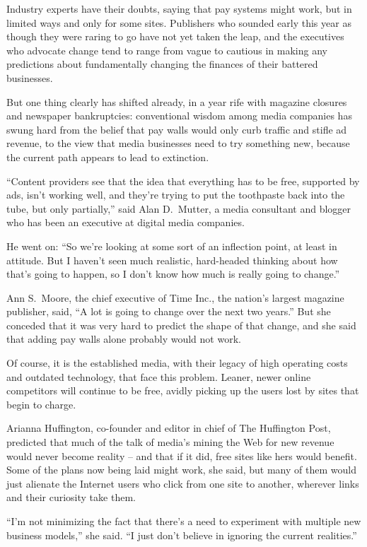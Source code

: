 ﻿\documentclass[12pt]{article}
\begin{document}
Industry experts have their doubts, saying that pay systems might work, but in limited ways and only
for some sites. Publishers who sounded early this year as though they were raring to go have not yet
taken the leap, and the executives who advocate change tend to range from vague to cautious in
making any predictions about fundamentally changing the finances of their battered businesses.

But one thing clearly has shifted already, in a year rife with magazine closures and newspaper
bankruptcies: conventional wisdom among media companies has swung hard from the belief that pay
walls would only curb traffic and stifle ad revenue, to the view that media businesses need to try
something new, because the current path appears to lead to extinction.

``Content providers see that the idea that everything has to be free, supported by ads, isn't
working well, and they're trying to put the toothpaste back into the tube, but only partially,''
said Alan D.~Mutter, a media consultant and blogger who has been an executive at digital media
companies.

He went on: ``So we're looking at some sort of an inflection point, at least in attitude. But I
haven't seen much realistic, hard-headed thinking about how that's going to happen, so I don't know
how much is really going to change.''

Ann S.~Moore, the chief executive of Time Inc., the nation's largest magazine publisher, said, ``A
lot is going to change over the next two years.'' But she conceded that it was very hard to predict
the shape of that change, and she said that adding pay walls alone probably would not work.

Of course, it is the established media, with their legacy of high operating costs and outdated
technology, that face this problem. Leaner, newer online competitors will continue to be free,
avidly picking up the users lost by sites that begin to charge.

Arianna Huffington, co-founder and editor in chief of The Huffington Post, predicted that much of
the talk of media's mining the Web for new revenue would never become reality -- and that if it did,
free sites like hers would benefit. Some of the plans now being laid might work, she said, but many
of them would just alienate the Internet users who click from one site to another, wherever links
and their curiosity take them.

``I'm not minimizing the fact that there's a need to experiment with multiple new business models,''
she said. ``I just don't believe in ignoring the current realities.''
\end{document}
